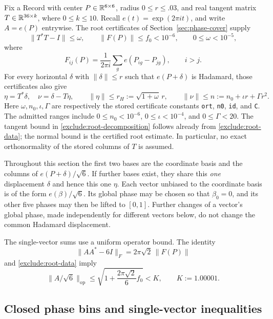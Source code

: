Fix a Record with center $P\in\mathbb R^{6\times6}$, radius $0\le r\le .03$,
and real tangent matrix $T\in\mathbb R^{36\times k}$, where $0\le k\le10$.
Recall $e(t)=\exp(2\pi i t)$, and write $A=e(P)$ entrywise.
The root certificates of Section~\ref{sec:phase-cover} supply
\begin{equation}
 \|T^*T-I\|\le\omega,\qquad
 \|F(P)\|\le f_0<10^{-6},\qquad 0\le\omega<10^{-5},
 \label{exclude:root-data}
\end{equation}
where
\[
 F_{ij}(P)=\frac{1}{2\pi i}\sum_g e(P_{ig}-P_{jg}),\qquad i>j.
\]
For every horizontal $\delta$ with $\|\delta\|\le r$ such that
$e(P+\delta)$ is Hadamard, those certificates also give
\begin{equation}
 \eta=T^*\delta,\quad \nu=\delta-T\eta,\qquad
 \|\eta\|\le r_H:=\sqrt{1+\omega}\,r,\qquad
 \|\nu\|\le n:=n_0+\iota r+\Gamma r^2.
 \label{exclude:root-decomposition}
\end{equation}
Here $\omega,n_0,\iota,\Gamma$ are respectively the stored certificate
constants \texttt{ort}, \texttt{n0}, \texttt{id}, and \texttt{C}.
The admitted ranges include $0\le n_0<10^{-6}$,
$0\le\iota<10^{-4}$, and $0\le\Gamma<20$.
The tangent bound in \eqref{exclude:root-decomposition} follows already
from \eqref{exclude:root-data}; the normal bound is the certified root
estimate.  In particular, no exact orthonormality of the stored columns
of $T$ is assumed.

Throughout this section the first two bases are the coordinate basis
and the columns of $e(P+\delta)/\sqrt6$.  If further bases exist, they
share this \emph{one} displacement $\delta$ and hence this one $\eta$.
Each vector unbiased to the coordinate basis is of the form
$e(\beta)/\sqrt6$.  Its global phase may be chosen so that $\beta_0=0$,
and its other five phases may then be lifted to $[0,1]$.  Further
changes of a vector's global phase, made independently for different
vectors below, do not change the common Hadamard displacement.

The single-vector sums use a uniform operator bound.  The identity
\[
 \|AA^*-6I\|_F=2\pi\sqrt2\,\|F(P)\|
\]
and \eqref{exclude:root-data} imply
\begin{equation}
 \|A/\sqrt6\|_{\mathrm{op}}
 \le \sqrt{1+\frac{2\pi\sqrt2}{6}f_0}<K,
 \qquad K:=1.00001.
 \label{exclude:operator-bound}
\end{equation}

\subsection{Closed phase bins and single-vector inequalities}

